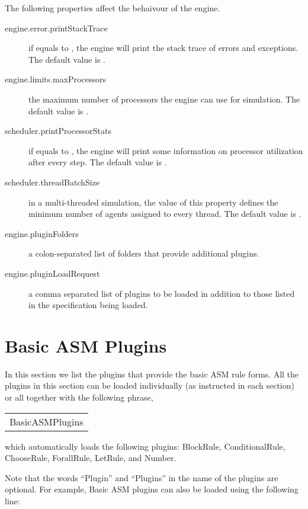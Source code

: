 \documentclass{article}
\newcommand{\codebf}[1]{\xspace{\bf \code{#1}}\xspace}
\newcommand{\keyword}[1]{\codebf{#1}}
\newcommand{\bExample}{\begin{small} \vspace{0.3cm} \begin{tabular}{|l} \begin{minipage}{0.85\textwidth} \vspace{0.2cm} \ttfamily}
\newcommand{\eExample}{\vspace{0.2cm} \end{minipage} \end{tabular} \vspace{0.3cm} \end{small}}
\begin{document}
The following properties affect the behaivour of the \CoreASM engine. 

\begin{description}
	\item[engine.error.printStackTrace] if equals to , the engine will 
		print the stack trace of errors and exceptions. The default value is . 

	\item[engine.limits.maxProcessors] the maximum number of processors the engine 
		can use for simulation. The default value is . 

	\item[scheduler.printProcessorStats] if equals to , the engine 
		will print some information on processor utilization after every step. The default value is . 

	\item[scheduler.threadBatchSize] in a multi-threaded simulation, the value
		of this property defines the minimum number of agents assigned to every thread.
	The default value is .
	
	\item[engine.pluginFolders] a colon-separated list of folders that provide additional plugins. 

	\item[engine.pluginLoadRequest] a comma separated list of plugins to be loaded in addition to those listed in the specification being loaded.
\end{description}

\section{Basic ASM Plugins}
\label{basicASM}

In this section we list the plugins that provide the basic ASM rule forms. All
the plugins in this section can be loaded individually (as instructed in each
section) or all together with the following \keyword{use} phrase, 

\bExample
	\codebf{use} BasicASMPlugins
\eExample

\noindent which automatically loads the following plugins: BlockRule,
ConditionalRule, ChooseRule, ForallRule, LetRule, and
Number.

Note that the words ``Plugin'' and ``Plugins'' in the name of the plugins are optional.
For example, Basic ASM plugins can also be loaded using the following line:
\end{document}
